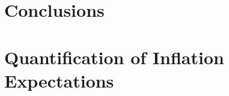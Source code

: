 \documentclass[review]{elsarticle}
\begin{document}
\section{Conclusions} \label{sec:Conclusions}




\newpage

\appendix

\section{Quantification of Inflation Expectations}\label{sec:Quantification of Inflation Expectations}
\end{document}
